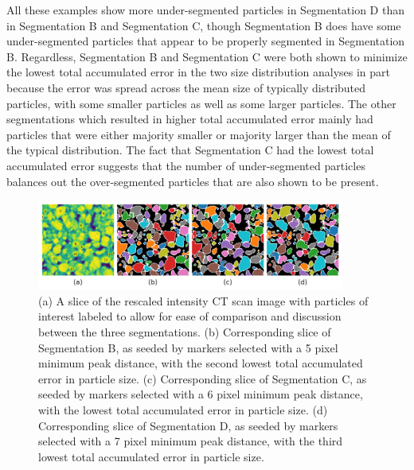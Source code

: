 All these examples show more under-segmented particles in Segmentation D
than in Segmentation B and Segmentation C, though Segmentation
B does have some under-segmented particles that appear to be properly
segmented in Segmentation B. Regardless, Segmentation B and Segmentation C
were both shown to minimize the
lowest total accumulated error in the two size distribution analyses in part
because the error was spread across the mean size of typically distributed
particles, with some smaller particles as well as some larger particles.
The other segmentations which resulted in higher total accumulated error
mainly had particles that were either majority smaller or majority larger
than the mean of the typical distribution.
The fact that Segmentation C had the lowest total accumulated error suggests
that the number of under-segmented particles balances out the over-segmented
particles that are also shown to be present.


\begin{figure}[ht]
    \centering
    \includegraphics[width=0.9\textwidth]{figures/06/08-slice_525-full_seg-5-6-7.png}
    \caption{
        \small{}
        (a) A slice of the rescaled intensity CT scan image with particles of
        interest labeled to allow for ease of comparison and discussion
        between the three segmentations.
        (b) Corresponding slice of Segmentation B, as seeded by markers
        selected with a 5 pixel minimum peak distance, with the second lowest
        total accumulated error in particle size.
        (c) Corresponding slice of Segmentation C, as seeded by markers
        selected with a 6 pixel minimum peak distance, with the lowest
        total accumulated error in particle size.
        (d) Corresponding slice of Segmentation D, as seeded by markers
        selected with a 7 pixel minimum peak distance, with the third lowest
        total accumulated error in particle size.
    }
    \label{fig/06/seg}
\end{figure}

